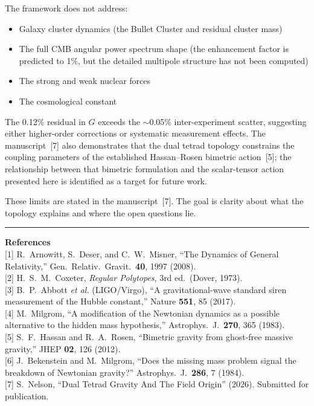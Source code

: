 \documentclass[11pt]{article}
\begin{document}
The framework does not address:
\begin{itemize}[leftmargin=2em]
\item Galaxy cluster dynamics (the Bullet Cluster and residual cluster mass)
\item The full CMB angular power spectrum shape (the enhancement factor is predicted to 1\%, but the detailed multipole structure has not been computed)
\item The strong and weak nuclear forces
\item The cosmological constant
\end{itemize}

\noindent
The 0.12\% residual in $G$ exceeds the $\sim$0.05\% inter-experiment scatter, suggesting either higher-order corrections or systematic measurement effects.
The manuscript~[7] also demonstrates that the dual tetrad topology constrains the coupling parameters of the established Hassan--Rosen bimetric action~[5]; the relationship between that bimetric formulation and the scalar-tensor action presented here is identified as a target for future work.

These limits are stated in the manuscript~[7].
The goal is clarity about what the topology explains and where the open questions lie.

\vspace{0.8cm}
\hrule
\vspace{0.5cm}

\small
\textbf{References}\\[4pt]
{[1]} R.~Arnowitt, S.~Deser, and C.~W.~Misner, ``The Dynamics of General Relativity,'' Gen.\ Relativ.\ Gravit.\ \textbf{40}, 1997 (2008).\\
{[2]} H.~S.~M.~Coxeter, \textit{Regular Polytopes}, 3rd ed.\ (Dover, 1973).\\
{[3]} B.~P.~Abbott \textit{et al.} (LIGO/Virgo), ``A gravitational-wave standard siren measurement of the Hubble constant,'' Nature \textbf{551}, 85 (2017).\\
{[4]} M.~Milgrom, ``A modification of the Newtonian dynamics as a possible alternative to the hidden mass hypothesis,'' Astrophys.\ J.\ \textbf{270}, 365 (1983).\\
{[5]} S.~F.~Hassan and R.~A.~Rosen, ``Bimetric gravity from ghost-free massive gravity,'' JHEP \textbf{02}, 126 (2012).\\
{[6]} J.~Bekenstein and M.~Milgrom, ``Does the missing mass problem signal the breakdown of Newtonian gravity?'' Astrophys.\ J.\ \textbf{286}, 7 (1984).\\
{[7]} S.~Nelson, ``Dual Tetrad Gravity And The Field Origin'' (2026).
Submitted for publication.
\end{document}

